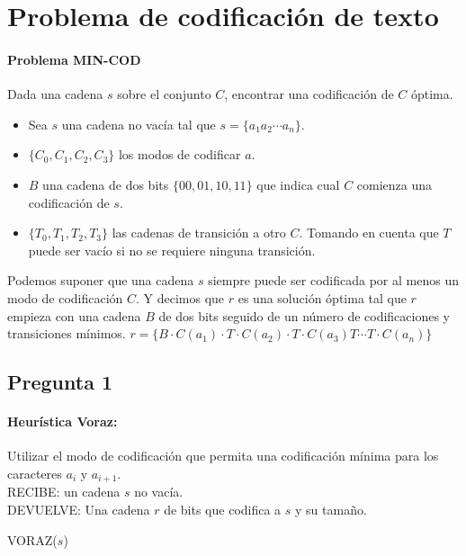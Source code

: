 \section{Problema de codificación de texto}

\paragraph{Problema MIN-COD}
Dada una cadena $s$ sobre el conjunto $C$, encontrar una codificación de $C$ óptima.

\begin{itemize}
    \item Sea $s$ una cadena no vacía tal que $s = \{a_1a_2\cdots a_n\}$. 
    \item $\{C_0, C_1, C_2, C_3\}$ los modos de codificar $a$.
    \item $B$ una cadena de dos bits $\{00, 01, 10, 11\}$ que indica cual $C$ comienza una 
    codificación de $s$.
    \item $\{T_0, T_1, T_2, T_3\}$ las cadenas de transición a otro $C$. Tomando en cuenta que 
    $T$ puede ser vacío si no se requiere ninguna transición.
\end{itemize}

Podemos suponer que una cadena $s$ siempre puede ser codificada por al menos un modo de 
codificación $C$. Y decimos que $r$ es una  solución óptima tal que $r$ empieza con una cadena 
$B$ de dos bits seguido de un número de  codificaciones y transiciones mínimos. 
$r=\{B \cdot C(a_1) \cdot T \cdot C(a_2) \cdot T \cdot C(a_3) T \cdots T \cdot C(a_n)\}$

\subsection{Pregunta 1}

\paragraph{Heurística Voraz:}
Utilizar el modo de codificación que permita una codificación mínima para los caracteres 
$a_i$ y $a_{i+1}$.\\

\noindent RECIBE: un cadena $s$ no vacía.\\
DEVUELVE: Una cadena $r$ de bits que codifica a $s$ y su tamaño.

\begin{algorithmic}[1]
\item[]{VORAZ($s$)}
\EndFor
{}
\EndIf
\end{algorithmic}

